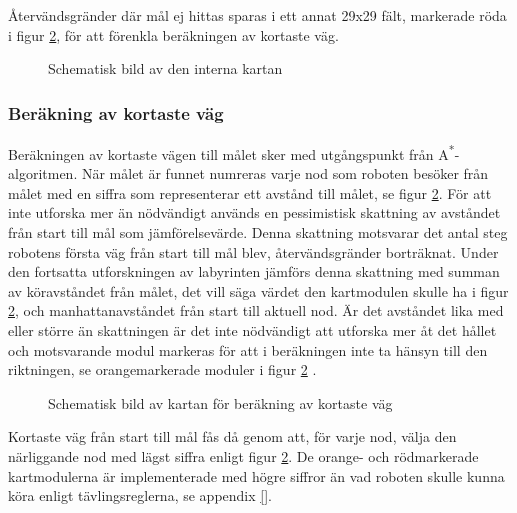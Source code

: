\documentclass[11pt]{article}
\begin{document}
\begin{flushleft}
Återvändsgränder där mål ej hittas sparas i ett annat 29x29 fält, markerade röda i figur \ref{path}, för att förenkla beräkningen av kortaste väg. 

\begin{figure}[htbp]
\centering
\noindent\resizebox{0.7\linewidth}{!}{
	}
	\caption{Schematisk bild av den interna kartan}	\label{map}
\end{figure}

\subsubsection{Beräkning av kortaste väg} \label{shortestPath}
Beräkningen av kortaste vägen till målet sker med utgångspunkt från A\textsuperscript{*}-algoritmen. När målet är funnet numreras varje nod som roboten besöker från målet med en siffra som representerar ett avstånd till målet, se figur \ref{path}. För att inte utforska mer än nödvändigt används en pessimistisk skattning av avståndet från start till mål som jämförelsevärde. Denna skattning motsvarar det antal steg robotens första väg från start till mål blev, återvändsgränder borträknat. Under den fortsatta utforskningen av labyrinten jämförs denna skattning med summan av köravståndet från målet, det vill säga värdet den kartmodulen skulle ha i figur \ref{path}, och manhattanavståndet från start till aktuell nod. Är det avståndet lika med eller större än skattningen är det inte nödvändigt att utforska mer åt det hållet och motsvarande modul markeras för att i beräkningen inte ta hänsyn till den riktningen, se orangemarkerade moduler i figur \ref{path} .

\begin{figure}[htbp]
\centering
\noindent\resizebox{0.7\linewidth}{!}{
	}
	\caption{Schematisk bild av kartan för beräkning av kortaste väg}	\label{path}
\end{figure}


Kortaste väg från start till mål fås då genom att, för varje nod, välja den närliggande nod med lägst siffra enligt figur \ref{path}. De orange- och rödmarkerade kartmodulerna är implementerade med högre siffror än vad roboten skulle kunna köra  enligt tävlingsreglerna, se appendix \ref{}.

\pagebreak


\end{flushleft}
\end{document}
